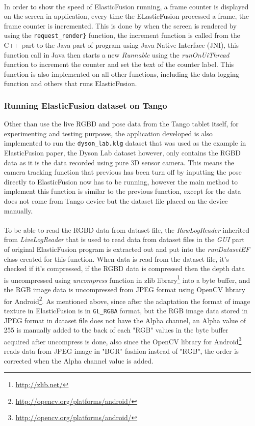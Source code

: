 \documentclass[12pt,twoside]{article}
\begin{document}
\\
In order to show the speed of ElasticFusion running, a frame counter is displayed on the screen in application, every time the ELasticFusion processed a frame, the frame counter is incremented. This is done by when the screen is rendered by using the \verb|request_render}| function, the increment function is called from the C++ part to the Java part of program using Java Native Interface (JNI), this function call in Java then starts a new \textit{Runnable} using the \textit{runOnUiThread} function to increment the counter and set the text of the counter label. This function is also implemented on all other functions, including the data logging function and others that runs ElasticFusion.\\



\subsubsection{Running ElasticFusion dataset on Tango}
Other than use the live RGBD and pose data from the Tango tablet itself, for experimenting and testing purposes, the application developed is also implemented to run the \verb|dyson_lab.klg| dataset that was used as the example in ElasticFusion paper\citep{whelan2016elasticfusion}, the Dyson Lab dataset however, only contains the RGBD data as it is the data recorded using pure 3D sensor camera. This means the camera tracking function that previous has been turn off by inputting the pose directly to ElasticFusion now has to be running, however the main method to implement this function is similar to the previous function, except for the data does not come from Tango device but the dataset file placed on the device manually.\\
\\
To be able to read the RGBD data from dataset file, the \textit{RawLogReader} inherited from \textit{LiveLogReader} that is used to read data from dataset files in the \textit{GUI} part of original ElasticFusion program is extracted out and put into the \textit{runDatasetEF} class created for this function. When data is read from the dataset file, it's checked if it's compressed, if the RGBD data is compressed then the depth data is uncompressed using \textit{uncompress} function in zlib library\footnote{\url{http://zlib.net/}} into a byte buffer, and the RGB image data is uncompressed from JPEG format using OpenCV library for Android\footnote{\url{http://opencv.org/platforms/android/}}. As mentioned above, since after the adaptation the format of image texture in ElasticFusion is in \verb|GL_RGBA| format, but the RGB image data stored in JPEG format in dataset file does not have the Alpha channel, an Alpha value of 255 is manually added to the back of each "RGB" values in the byte buffer acquired after uncompress is done, also since the OpenCV library for Android\footnote{\url{http://opencv.org/platforms/android/}} reads data from JPEG image in "BGR" fashion instead of "RGB", the order is corrected when the Alpha channel value is added.\\
\end{document}
